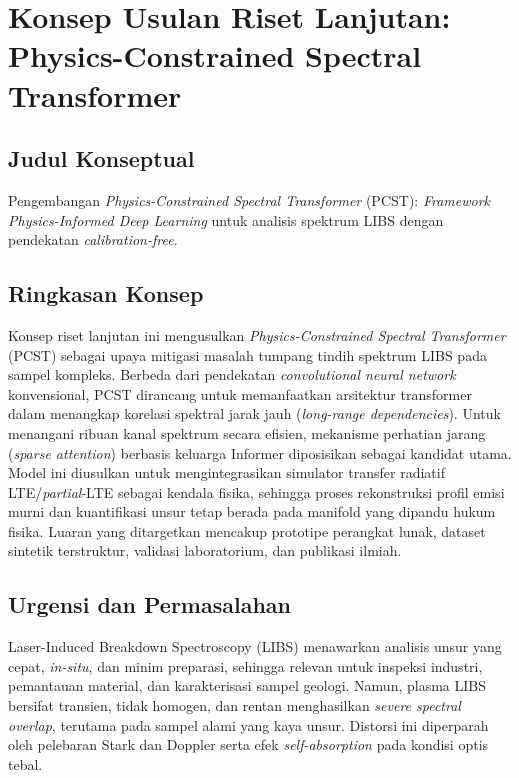 \section{Konsep Usulan Riset Lanjutan: Physics-Constrained Spectral Transformer}

\subsection{Judul Konseptual}
Pengembangan \textit{Physics-Constrained Spectral Transformer} (PCST): \textit{Framework Physics-Informed Deep Learning} untuk analisis spektrum LIBS dengan pendekatan \textit{calibration-free}.

\subsection{Ringkasan Konsep}
Konsep riset lanjutan ini mengusulkan \textit{Physics-Constrained Spectral Transformer} (PCST) sebagai upaya mitigasi masalah tumpang tindih spektrum LIBS pada sampel kompleks. Berbeda dari pendekatan \textit{convolutional neural network} konvensional, PCST dirancang untuk memanfaatkan arsitektur transformer dalam menangkap korelasi spektral jarak jauh (\textit{long-range dependencies}). Untuk menangani ribuan kanal spektrum secara efisien, mekanisme perhatian jarang (\textit{sparse attention}) berbasis keluarga Informer diposisikan sebagai kandidat utama. Model ini diusulkan untuk mengintegrasikan simulator transfer radiatif LTE/\textit{partial}-LTE sebagai kendala fisika, sehingga proses rekonstruksi profil emisi murni dan kuantifikasi unsur tetap berada pada manifold yang dipandu hukum fisika. Luaran yang ditargetkan mencakup prototipe perangkat lunak, dataset sintetik terstruktur, validasi laboratorium, dan publikasi ilmiah.

\subsection{Urgensi dan Permasalahan}
Laser-Induced Breakdown Spectroscopy (LIBS) menawarkan analisis unsur yang cepat, \textit{in-situ}, dan minim preparasi, sehingga relevan untuk inspeksi industri, pemantauan material, dan karakterisasi sampel geologi. Namun, plasma LIBS bersifat transien, tidak homogen, dan rentan menghasilkan \textit{severe spectral overlap}, terutama pada sampel alami yang kaya unsur. Distorsi ini diperparah oleh pelebaran Stark dan Doppler serta efek \textit{self-absorption} pada kondisi optis tebal.

